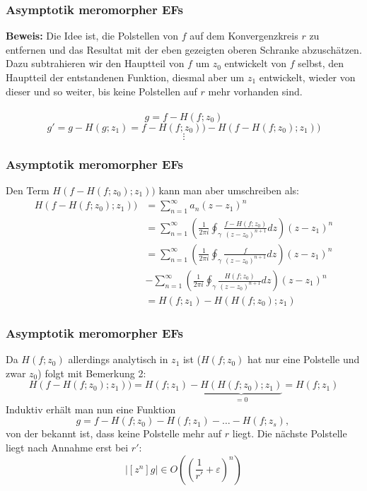 \documentclass{beamer}
\begin{document}
\begin{frame}\frametitle{Asymptotik meromorpher EFs}
  \textbf{Beweis:}
  Die Idee ist, die Polstellen von $f$ auf dem Konvergenzkreis $r$ zu entfernen und das Resultat mit der eben gezeigten oberen Schranke abzuschätzen. Dazu subtrahieren wir den Hauptteil von $f$ um $z_0$ entwickelt von $f$ selbst, den Hauptteil der entstandenen Funktion, diesmal aber um $z_1$ entwickelt, wieder von dieser und so weiter, bis keine Polstellen auf $r$ mehr vorhanden sind. \\
  \qquad \\
  \[
    g = f - H(f; z_0)
  \]
  \[
    g' = g - H(g; z_1) = f - H(f; z_0)) - H(f - H(f; z_0); z_1))
  \]
  \[
    \vdots
  \]
\end{frame}

\begin{frame}\frametitle{Asymptotik meromorpher EFs}
  Den Term $H(f - H(f; z_0); z_1))$ kann man aber umschreiben als:
  \begin{align*}
    H(f - H(f; z_0); z_1)) &= \sum\limits_{n = 1}^\infty a_n (z - z_1)^n \\
                           &= \sum\limits_{n = 1}^\infty \left( \frac{1}{2 \pi i} \oint_\gamma \frac{f - H(f; z_0)}{(z - z_0)^{n + 1}} dz \right) (z - z_1)^n \\
                           &= \sum\limits_{n = 1}^\infty \left( \frac{1}{2 \pi i} \oint_\gamma \frac{f}{(z - z_0)^{n + 1}} dz \right) (z - z_1)^n \\
                           &- \sum\limits_{n = 1}^\infty \left( \frac{1}{2 \pi i} \oint_\gamma \frac{H(f; z_0)}{(z - z_0)^{n + 1}} dz \right) (z - z_1)^n \\
                           &= H(f; z_1) - H(H(f; z_0); z_1)
  \end{align*}
\end{frame}

\begin{frame}\frametitle{Asymptotik meromorpher EFs}
  Da $H(f; z_0)$ allerdings analytisch in $z_1$ ist ($H(f; z_0)$ hat nur eine Polstelle und zwar $z_0$) folgt mit Bemerkung 2:
  \[
    H(f - H(f; z_0); z_1)) = H(f; z_1) - \underbrace{H(H(f; z_0); z_1)}_{= 0} =  H(f; z_1)
  \]
  Induktiv erhält man nun eine Funktion
  \[
    g = f - H(f; z_0) - H(f; z_1) - \dots - H(f; z_s) \text{, }
  \]
  von der bekannt ist, dass keine Polstelle mehr auf $r$ liegt. Die nächste Polstelle liegt nach Annahme erst bei $r'$:
  \[
    \left| [z^n] g \right| \in O \left( \left(\frac{1}{r'} + \varepsilon \right)^n \right)
  \]
\end{frame}
\end{document}
